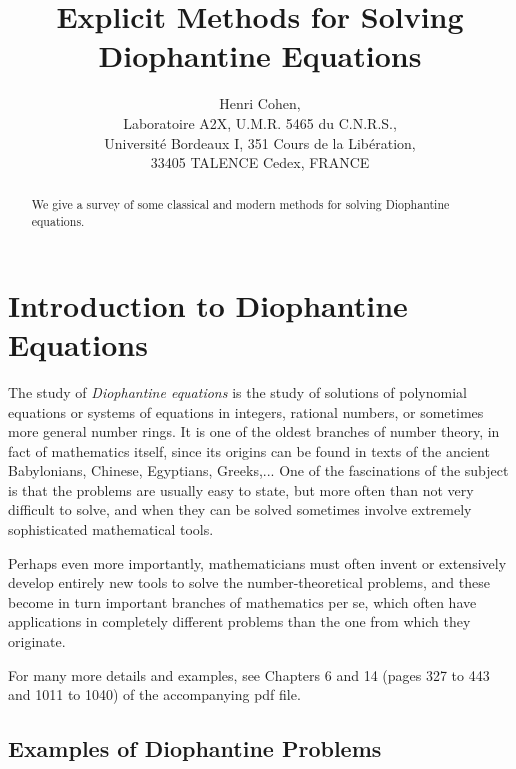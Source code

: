 \documentclass[12pt,a4paper]{article}
\begin{document}
\pagestyle{plain}

\title{Explicit Methods for Solving Diophantine Equations}
\author{Henri Cohen,\\
Laboratoire A2X, U.M.R. 5465 du C.N.R.S.,\\
Universit\'e Bordeaux I, 351 Cours de la Lib\'eration,\\
33405 TALENCE Cedex, FRANCE}
\maketitle

\begin{abstract}
We give a survey of some classical and modern methods for solving Diophantine
equations.
\end{abstract}

\section{Introduction to Diophantine Equations}

The study of \emph{Diophantine equations} is the study of solutions of
polynomial equations or systems of equations in integers, rational numbers, or 
sometimes more general number rings. It is one of the oldest branches of number
theory, in fact of mathematics itself, since its origins can be found in texts
of the ancient Babylonians, Chinese, Egyptians, Greeks,... One of the
fascinations of the subject is that the problems are usually easy to state,
but more often than not very difficult to solve, and when they can be
solved sometimes involve extremely sophisticated mathematical tools.

Perhaps even more importantly, mathematicians must often invent or extensively
develop entirely new tools to solve the number-theoretical problems,
and these become in turn important branches of mathematics per se, which
often have applications in completely different problems than the one from
which they originate.

\smallskip

For many more details and examples, see Chapters 6 and 14 (pages
327 to 443 and 1011 to 1040) of the accompanying pdf file.

\subsection{Examples of Diophantine Problems}
\end{document}
